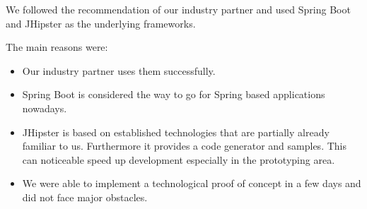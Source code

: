 We followed the recommendation of our industry partner and used Spring Boot\cite{springboot} and JHipster\cite{jhipster} as the underlying frameworks.

The main reasons were:

\begin{itemize}
	\item Our industry partner uses them successfully.
	\item Spring Boot is considered the way to go for Spring based applications nowadays.
	\item JHipster is based on established technologies that are partially already familiar to us. Furthermore it provides a code generator and samples. This can noticeable speed up development especially in the prototyping area.
	\item We were able to implement a technological proof of concept in a few days and did not face major obstacles.
\end{itemize}



